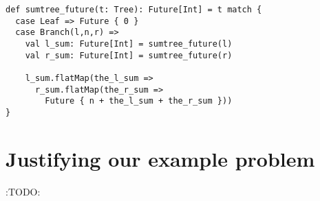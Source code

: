 \documentclass[11pt]{article}
\begin{document}
\begin{verbatim}
def sumtree_future(t: Tree): Future[Int] = t match { 
  case Leaf => Future { 0 }
  case Branch(l,n,r) =>
    val l_sum: Future[Int] = sumtree_future(l)
    val r_sum: Future[Int] = sumtree_future(r)

    l_sum.flatMap(the_l_sum =>
      r_sum.flatMap(the_r_sum =>
        Future { n + the_l_sum + the_r_sum }))
}
\end{verbatim}

\section{Justifying our example problem}
\label{sec:org031a291}
:TODO:
\end{document}
